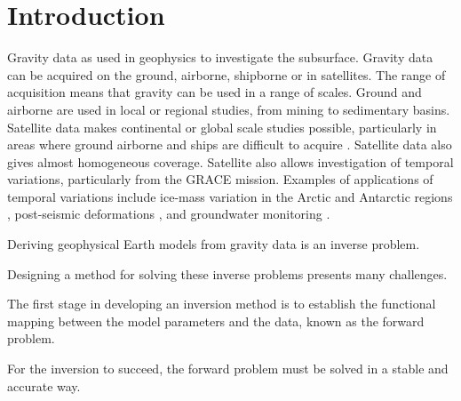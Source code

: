 \chapter{Introduction}


Gravity data as used in geophysics to investigate the subsurface.
Gravity data can be acquired on the ground, airborne, shipborne or in satellites.
The range of acquisition means that gravity can be used in a range of scales.
Ground and airborne are used in local or regional studies, from mining to
sedimentary basins.
Satellite data makes continental or global scale studies possible, particularly
in areas where ground airborne and ships are difficult to acquire
\citep[e.g., ][]{vandermeijde2013, vandermeijde2015, bouman2013,
braitenberg2015, reguzzoni2013}.
Satellite data also gives almost homogeneous coverage.
Satellite also allows investigation of temporal variations, particularly from
the GRACE mission.
Examples of applications of temporal variations include ice-mass variation in
the Arctic and Antarctic regions
\citep{chen2011, ramillien2006},
post-seismic deformations \citep{mikhailov2014},
and groundwater monitoring \citep{humphrey2016}.


Deriving geophysical Earth models from gravity data is an inverse problem.

Designing a method for solving these inverse problems presents many challenges.

The first stage in developing an inversion method is to establish the
functional mapping between the model parameters and the data, known as the
forward problem.

For the inversion to succeed, the forward problem must be solved in a stable
and accurate way.

